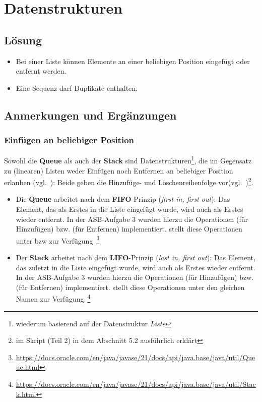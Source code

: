 \chapter{Datenstrukturen}

\section*{Lösung}

\begin{itemize}
    \item Bei einer Liste können Elemente an einer beliebigen Position eingefügt oder entfernt werden.
    \item Eine Sequenz darf Duplikate enthalten.
\end{itemize}


\section*{Anmerkungen und Ergänzungen}

\subsection*{Einfügen an beliebiger Position}
Sowohl die \textbf{Queue} als auch der \textbf{Stack} sind Datenstrukturen\footnote{wiederum basierend auf der Datenstruktur \textit{Liste}}, die im Gegensatz zu (linearen) Listen weder Einfügen noch Entfernen an beliebiger Position erlauben (vgl.~\cite[41]{OW17a}): Beide geben die Hinzufüge- und Löschenreihenfolge vor(vgl.~\cite[42]{OW17a})\footnote{im Skript (Teil 2) in dem Abschnitt 5.2 ausführlich erklärt}.

\begin{itemize}
    \item Die \textbf{Queue} arbeitet nach dem \textbf{FIFO}-Prinzip (\textit{first in, first out}): Das Element,
    das als Erstes in die Liste eingefügt wurde, wird auch als Erstes wieder entfernt.
    In der ASB-Aufgabe 3 wurden hierzu die Operationen  (für Hinzufügen) bzw.  (für Entfernen) implementiert.
     stellt diese Operationen unter  bzw  zur Verfügung~\footnote{
        \url{https://docs.oracle.com/en/java/javase/21/docs/api/java.base/java/util/Queue.html}
    }
    \item Der \textbf{Stack} arbeitet nach dem \textbf{LIFO}-Prinzip (\textit{last in, first out}): Das Element,
    das zuletzt in die Liste eingefügt wurde, wird auch als Erstes wieder entfernt.
    In der ASB-Aufgabe 3 wurden hierzu die Operationen  (für Hinzufügen) bzw.  (für Entfernen) implementiert.
     stellt diese Operationen unter den gleichen Namen zur Verfügung~\footnote{
        \url{https://docs.oracle.com/en/java/javase/21/docs/api/java.base/java/util/Stack.html}
    }
\end{itemize}



